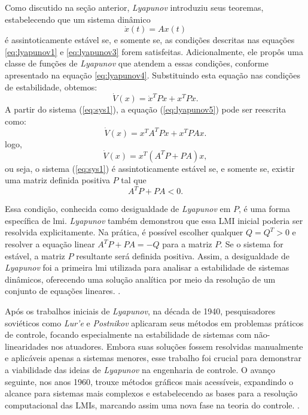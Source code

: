 Como discutido na seção anterior, \textit{Lyapunov }introduziu seus teoremas, estabelecendo que um sistema dinâmico \begin{equation} \dot{x}(t) = Ax(t) \label{eq:sys1}\end{equation} é assintoticamente estável se, e somente se, as condições descritas nas equações \eqref{eq:lyapunov1} e \eqref{eq:lyapunov3} forem satisfeitas. Adicionalmente, ele propôs uma classe de funções de \textit{Lyapunov }que atendem a essas condições, conforme apresentado na equação \eqref{eq:lyapunov4}. Substituindo esta equação nas condições de estabilidade, obtemos: \begin{equation} \dot{V}(x) = \dot{x}^TPx + x^TP\dot{x} \label{eq:lyapunov5}. \end{equation} A partir do sistema (\ref{eq:sys1}), a equação (\ref{eq:lyapunov5}) pode ser reescrita como: \begin{equation} \dot{V}(x) = x^TA^TPx + x^TPAx \label{eq:lyapunov6}. \end{equation} logo, \begin{equation} \dot{V}(x) = x^T (A^TP + PA) x \label{eq:lyapunov7}, \end{equation} ou seja, o sistema (\ref{eq:sys1}) é assintoticamente estável se, e somente se, existir uma matriz definida positiva $P$ tal que \begin{equation} A^T P + P A < 0.\end{equation}

Essa condição, conhecida como desigualdade de \textit{Lyapunov }em $P$, é uma forma específica de \acrshort{lmi}. \textit{Lyapunov }também demonstrou que essa LMI inicial poderia ser resolvida explicitamente. Na prática, é possível escolher qualquer $Q = Q^T > 0$ e resolver a equação linear $A^T P + P A = -Q$ para a matriz $P$. Se o sistema for estável, a matriz $P$ resultante será definida positiva. Assim, a desigualdade de \textit{Lyapunov }foi a primeira \acrshort{lmi} utilizada para analisar a estabilidade de sistemas dinâmicos, oferecendo uma solução analítica por meio da resolução de um conjunto de equações lineares. \citep{lyapunov1892,boyd1994}.

Após os trabalhos iniciais de \textit{Lyapunov}, na década de 1940, pesquisadores soviéticos como \textit{Lur'e} e \textit{Postnikov} aplicaram seus métodos em problemas práticos de controle, focando especialmente na estabilidade de sistemas com não-linearidades nos atuadores. Embora suas soluções fossem resolvidas manualmente e aplicáveis apenas a sistemas menores, esse trabalho foi crucial para demonstrar a viabilidade das ideias de \textit{Lyapunov }na engenharia de controle. O avanço seguinte, nos anos 1960, trouxe métodos gráficos mais acessíveis, expandindo o alcance para sistemas mais complexos e estabelecendo as bases para a resolução computacional das LMIs, marcando assim uma nova fase na teoria do controle. \citep{boyd1994}.

